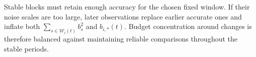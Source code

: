 Stable blocks must retain enough accuracy for the chosen fixed window. If their noise scales are too large, later observations replace earlier accurate ones and inflate both $\sum_{s\in\mathcal W_i(t)}b_s^2$ and $b_{i,*}(t)$. Budget concentration around changes is therefore balanced against maintaining reliable comparisons throughout the stable periods.
